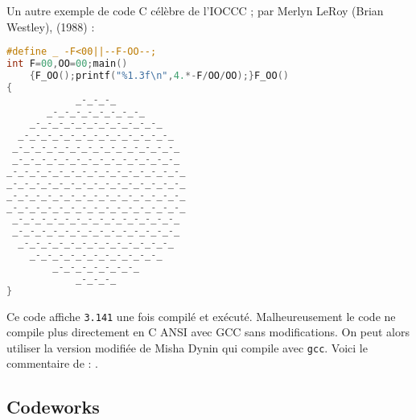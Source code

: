 \documentclass[12pt]{article} %
\begin{document}
\newpage
Un autre exemple de code C célèbre de l'IOCCC ; par Merlyn LeRoy (Brian Westley), (1988) :
\begin{lstlisting}[language=C, caption={Pi circle (westley 1988)}, label={code:pi-circle}]
#define _ -F<00||--F-OO--;
int F=00,OO=00;main()
    {F_OO();printf("%1.3f\n",4.*-F/OO/OO);}F_OO()
{
            _-_-_-_
       _-_-_-_-_-_-_-_-_
    _-_-_-_-_-_-_-_-_-_-_-_
  _-_-_-_-_-_-_-_-_-_-_-_-_-_
 _-_-_-_-_-_-_-_-_-_-_-_-_-_-_
 _-_-_-_-_-_-_-_-_-_-_-_-_-_-_
_-_-_-_-_-_-_-_-_-_-_-_-_-_-_-_
_-_-_-_-_-_-_-_-_-_-_-_-_-_-_-_
_-_-_-_-_-_-_-_-_-_-_-_-_-_-_-_
_-_-_-_-_-_-_-_-_-_-_-_-_-_-_-_
 _-_-_-_-_-_-_-_-_-_-_-_-_-_-_
 _-_-_-_-_-_-_-_-_-_-_-_-_-_-_
  _-_-_-_-_-_-_-_-_-_-_-_-_-_
    _-_-_-_-_-_-_-_-_-_-_-_
        _-_-_-_-_-_-_-_
            _-_-_-_
}
\end{lstlisting}
Ce code affiche \verb|3.141| une fois compilé et exécuté. Malheureusement le code ne compile plus directement en C ANSI avec GCC sans modifications. On peut alors utiliser la version modifiée de Misha Dynin qui compile avec \verb|gcc|. Voici le commentaire de \citeauthor{MEnriqueBermudez-ObfuscatedCCode} :  \cite{MEnriqueBermudez-ObfuscatedCCode}.

\newpage
\subsection{Codeworks}

\newpage
\printglossary[type=\acronymtype, title=Acronymes]

\printglossary[title=Glossaire]

\newpage



\restoregeometry
\end{document}
